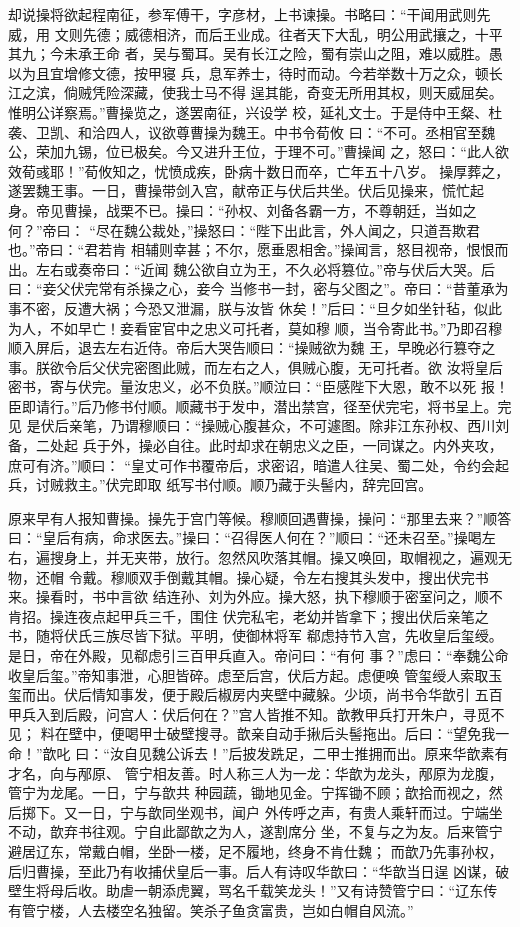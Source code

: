 却说操将欲起程南征，参军傅干，字彦材，上书谏操。书略曰：“干闻用武则先威，用
文则先德；威德相济，而后王业成。往者天下大乱，明公用武攘之，十平其九；今未承王命
者，吴与蜀耳。吴有长江之险，蜀有崇山之阻，难以威胜。愚以为且宜增修文德，按甲寝
兵，息军养士，待时而动。今若举数十万之众，顿长江之滨，倘贼凭险深藏，使我士马不得
逞其能，奇变无所用其权，则天威屈矣。惟明公详察焉。”曹操览之，遂罢南征，兴设学
校，延礼文士。于是侍中王粲、杜袭、卫凯、和洽四人，议欲尊曹操为魏王。中书令荀攸
曰：“不可。丞相官至魏公，荣加九锡，位已极矣。今又进升王位，于理不可。”曹操闻
之，怒曰：“此人欲效荀彧耶！”荀攸知之，忧愤成疾，卧病十数日而卒，亡年五十八岁。
操厚葬之，遂罢魏王事。一日，曹操带剑入宫，献帝正与伏后共坐。伏后见操来，慌忙起
身。帝见曹操，战栗不已。操曰：“孙权、刘备各霸一方，不尊朝廷，当如之何？”帝曰：
“尽在魏公裁处，”操怒曰：“陛下出此言，外人闻之，只道吾欺君也。”帝曰：“君若肯
相辅则幸甚；不尔，愿垂恩相舍。”操闻言，怒目视帝，恨恨而出。左右或奏帝曰：“近闻
魏公欲自立为王，不久必将篡位。”帝与伏后大哭。后曰：“妾父伏完常有杀操之心，妾今
当修书一封，密与父图之”。帝曰：“昔董承为事不密，反遭大祸；今恐又泄漏，朕与汝皆
休矣！”后曰：“旦夕如坐针毡，似此为人，不如早亡！妾看宦官中之忠义可托者，莫如穆
顺，当令寄此书。”乃即召穆顺入屏后，退去左右近侍。帝后大哭告顺曰：“操贼欲为魏
王，早晚必行篡夺之事。朕欲令后父伏完密图此贼，而左右之人，俱贼心腹，无可托者。欲
汝将皇后密书，寄与伏完。量汝忠义，必不负朕。”顺泣曰：“臣感陛下大恩，敢不以死
报！臣即请行。”后乃修书付顺。顺藏书于发中，潜出禁宫，径至伏完宅，将书呈上。完见
是伏后亲笔，乃谓穆顺曰：“操贼心腹甚众，不可遽图。除非江东孙权、西川刘备，二处起
兵于外，操必自往。此时却求在朝忠义之臣，一同谋之。内外夹攻，庶可有济。”顺曰：
“皇丈可作书覆帝后，求密诏，暗遣人往吴、蜀二处，令约会起兵，讨贼救主。”伏完即取
纸写书付顺。顺乃藏于头髻内，辞完回宫。

原来早有人报知曹操。操先于宫门等候。穆顺回遇曹操，操问：“那里去来？”顺答
曰：“皇后有病，命求医去。”操曰：“召得医人何在？”顺曰：“还未召至。”操喝左
右，遍搜身上，并无夹带，放行。忽然风吹落其帽。操又唤回，取帽视之，遍观无物，还帽
令戴。穆顺双手倒戴其帽。操心疑，令左右搜其头发中，搜出伏完书来。操看时，书中言欲
结连孙、刘为外应。操大怒，执下穆顺于密室问之，顺不肯招。操连夜点起甲兵三千，围住
伏完私宅，老幼并皆拿下；搜出伏后亲笔之书，随将伏氏三族尽皆下狱。平明，使御林将军
郗虑持节入宫，先收皇后玺绶。是日，帝在外殿，见郗虑引三百甲兵直入。帝问曰：“有何
事？”虑曰：“奉魏公命收皇后玺。”帝知事泄，心胆皆碎。虑至后宫，伏后方起。虑便唤
管玺绶人索取玉玺而出。伏后情知事发，便于殿后椒房内夹壁中藏躲。少顷，尚书令华歆引
五百甲兵入到后殿，问宫人：伏后何在？”宫人皆推不知。歆教甲兵打开朱户，寻觅不见；
料在壁中，便喝甲士破壁搜寻。歆亲自动手揪后头髻拖出。后曰：“望免我一命！”歆叱
曰：“汝自见魏公诉去！”后披发跣足，二甲士推拥而出。原来华歆素有才名，向与邴原、
管宁相友善。时人称三人为一龙：华歆为龙头，邴原为龙腹，管宁为龙尾。一日，宁与歆共
种园蔬，锄地见金。宁挥锄不顾；歆拾而视之，然后掷下。又一日，宁与歆同坐观书，闻户
外传呼之声，有贵人乘轩而过。宁端坐不动，歆弃书往观。宁自此鄙歆之为人，遂割席分
坐，不复与之为友。后来管宁避居辽东，常戴白帽，坐卧一楼，足不履地，终身不肯仕魏；
而歆乃先事孙权，后归曹操，至此乃有收捕伏皇后一事。后人有诗叹华歆曰：“华歆当日逞
凶谋，破壁生将母后收。助虐一朝添虎翼，骂名千载笑龙头！”又有诗赞管宁曰：“辽东传
有管宁楼，人去楼空名独留。笑杀子鱼贪富贵，岂如白帽自风流。”

